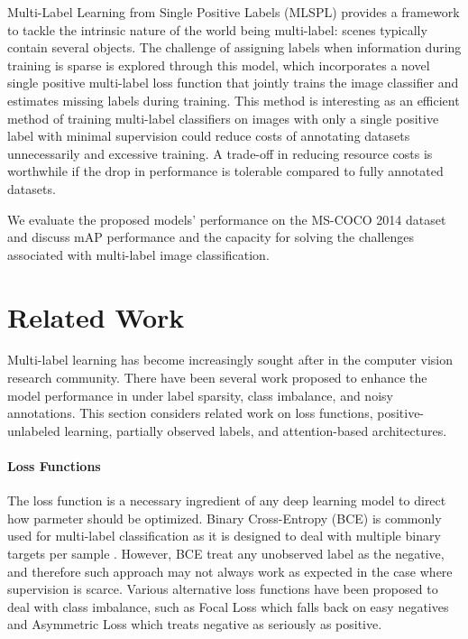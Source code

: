 \documentclass[lettersize,journal]{IEEEtran}
\begin{document}
Multi-Label Learning from Single Positive Labels (MLSPL) provides a framework to tackle the intrinsic nature of the world being multi-label: scenes typically contain several objects. The challenge of assigning labels when information during training is sparse is explored through this model, which incorporates a novel single positive multi-label loss function that jointly trains the image classifier and estimates missing labels during training. This method is interesting as an efficient method of training multi-label classifiers on images with only a single positive label with minimal supervision could reduce costs of annotating datasets unnecessarily and excessive training. A trade-off in reducing resource costs is worthwhile if the drop in performance is tolerable compared to fully annotated datasets. 

We evaluate the proposed models' performance on the MS-COCO 2014 dataset and discuss mAP performance and the capacity for solving the challenges associated with multi-label image classification.

\section{Related Work}
Multi-label learning has become increasingly sought after in the computer vision research community. There have been several work proposed to enhance the model performance in under label sparsity, class imbalance, and noisy annotations. This section considers related work on loss functions, positive-unlabeled learning, partially observed labels, and attention-based architectures.


\paragraph{Loss Functions}
The loss function is a necessary ingredient of any deep learning model to direct how parmeter should be optimized. Binary Cross-Entropy (BCE) is commonly used for multi-label classification as it is designed to deal with multiple binary targets per sample \cite{mlsp,durand2019learningdeepconvnetmultilabel}. However, BCE treat any unobserved label as the negative, and therefore such approach may not always work as expected in the case where supervision is scarce. Various alternative loss functions have been proposed to deal with class imbalance, such as Focal Loss  which falls back on easy negatives and Asymmetric Loss which treats negative as seriously as positive.
\end{document}
